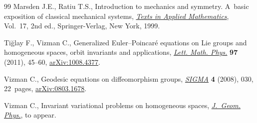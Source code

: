 \begin{thebibliography}{99}
Marsden J.E., Ratiu T.S., Introduction to mechanics and symmetry. A~basic
  exposition of classical mecha\-ni\-cal systems, \href{http://dx.doi.org/10.1007/978-0-387-21792-5}{\textit{Texts in Applied
  Mathematics}}, Vol.~17, 2nd ed., Springer-Verlag, New York, 1999.

Ti{\u{g}}lay F., Vizman C., Generalized {E}uler--{P}oincar\'e equations on
  {L}ie groups and homogeneous spaces, orbit invariants and applications,
  \href{http://dx.doi.org/10.1007/s11005-011-0464-2}{\textit{Lett. Math. Phys.}} \textbf{97} (2011), 45--60, \href{http://arxiv.org/abs/1008.4377}{arXiv:1008.4377}.

Vizman C., Geodesic equations on dif\/feomorphism groups, \href{http://dx.doi.org/10.3842/SIGMA.2008.030}{\textit{SIGMA}}
  \textbf{4} (2008), 030, 22~pages, \href{http://arxiv.org/abs/0803.1678}{arXiv:0803.1678}.

Vizman C., Invariant variational problems on homogeneous spaces,
  \href{http://dx.doi.org/10.1016/j.geomphys.2014.10.012}{\textit{J.~Geom. Phys.}}, {t}o appear.

\end{thebibliography}
